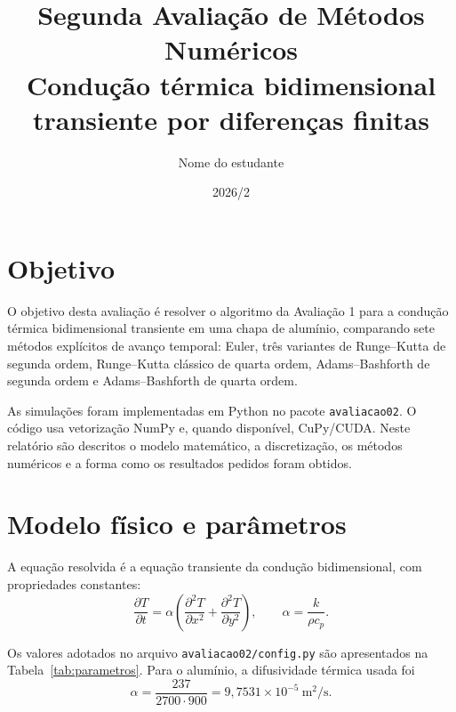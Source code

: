 \documentclass[12pt,a4paper]{article}
\title{Segunda Avaliação de Métodos Numéricos\\
\large Condução térmica bidimensional transiente por diferenças finitas}
\author{Nome do estudante}
\date{2026/2}
\newcommand{\si}[1]{\ensuremath{\mathrm{#1}}}
\newcommand{\meter}{m}
\newcommand{\second}{s}
\newcommand{\per}{/}
\newcommand{\squared}{^2}
\begin{document}
\maketitle

\section{Objetivo}

O objetivo desta avaliação é resolver o algoritmo da Avaliação 1 para a condução
térmica bidimensional transiente em uma chapa de alumínio, comparando sete
métodos explícitos de avanço temporal:
Euler, três variantes de Runge--Kutta de segunda ordem, Runge--Kutta clássico de
quarta ordem, Adams--Bashforth de segunda ordem e Adams--Bashforth de quarta
ordem.

As simulações foram implementadas em Python no pacote \texttt{avaliacao02}. O
código usa vetorização NumPy e, quando disponível, CuPy/CUDA. Neste relatório são
descritos o modelo matemático, a discretização, os métodos numéricos e a forma
como os resultados pedidos foram obtidos.

\section{Modelo físico e parâmetros}

A equação resolvida é a equação transiente da condução bidimensional, com
propriedades constantes:
\begin{equation}
    \frac{\partial T}{\partial t}
    =
    \alpha\left(
    \frac{\partial^2 T}{\partial x^2}
    +
    \frac{\partial^2 T}{\partial y^2}
    \right),
    \qquad
    \alpha = \frac{k}{\rho c_p}.
    \label{eq:calor}
\end{equation}

Os valores adotados no arquivo \texttt{avaliacao02/config.py} são apresentados
na Tabela~\ref{tab:parametros}. Para o alumínio, a difusividade térmica usada
foi
\begin{equation}
    \alpha = \frac{237}{2700\cdot 900}
    = 9{,}7531\times 10^{-5}\ \si{\meter\squared\per\second}.
\end{equation}
\end{document}

